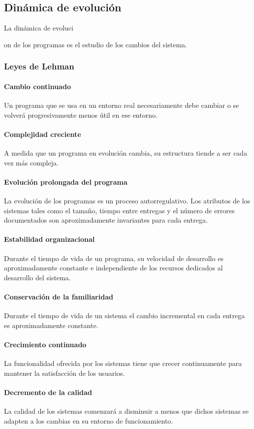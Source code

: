 \subsection{Dinámica de evolución}
La dinámica de evoluci{on de los programas es el estudio de los cambios del sistema.
\subsubsection{Leyes de Lehman}
\paragraph{Cambio continuado}
Un programa que se usa en un entorno real necesariamente debe cambiar o se volverá progresivamente menos útil en ese entorno.
\paragraph{Complejidad creciente}
A medida que un programa en evolución cambia, su estructura tiende a ser cada vez más compleja.
\paragraph{Evolución prolongada del programa}
La evolución de los programas es un proceso autorregulativo. Los atributos de los sistemas tales como el tamaño, tiempo entre entregas y el número de errores documentados son aproximadamente invariantes para cada entrega.
\paragraph{Estabilidad organizacional}
Durante el tiempo de vida de un programa, su velocidad de desarrollo es aproximadamente constante e independiente de los recursos dedicados al desarrollo del sistema.
\paragraph{Conservación de la familiaridad}
Durante el tiempo de vida de un sistema el cambio incremental en cada entrega es aproximadamente constante.
\paragraph{Crecimiento continuado}
La funcionalidad ofrecida por los sistemas tiene que crecer continuamente para mantener la satisfacción de los usuarios.
\paragraph{Decremento de la calidad}
La calidad de los sistemas comenzará a disminuir a menos que dichos sistemas se adapten a los cambias en su entorno de funcionamiento.
}
